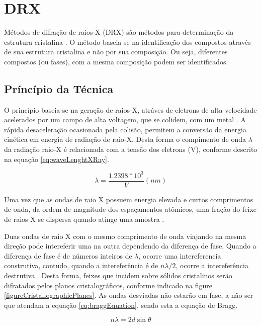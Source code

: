 \section{DRX}
Métodos de difração de raios-X (DRX) são métodos para determinação da
estrutura cristalina \cite{bookMaterialsCharacterizationYang}. O método 
baseia-se na identificação dos compostos através de sua estrutura 
cristalina e não por sua composição. Ou seja, diferentes compostos 
(ou fases), com a mesma composição podem ser identificados.

\subsection{Príncípio da Técnica}
O princípio baseia-se na geração de raios-X, atráves de eletrons de
alta velocidade acelerados por um campo de alta voltagem, que se colidem,
com um metal \cite{bookMaterialsCharacterizationYang}. A rápida desaceleração ocasionada pela colisão, permitem a
conversão da energia cinética em energia de radiação de raio-X. Desta forma
o compimento de onda $\lambda$ da radiação raio-X é relacionada com a tensão
dos eletrons (V), conforme descrito na equação \ref{eq:waveLenghtXRay}.

\begin{equation}\label{eq:waveLenghtXRay}
    \lambda = \frac{1.2398 * 10^{3}}{V} (nm)
\end{equation}

Uma vez que as ondas de raio X possuem energia elevada e curtos
comprimentos de onda, da ordem de magnitude dos espaçamentos atômicos, uma fração do feixe
de raios X se dispersa quando atinge uma amostra \cite{bookMaterialsScienceEngineeringCallister}.

Duas ondas de raio X com o mesmo comprimento de onda viajando na mesma direção
pode intereferir uma na outra dependendo da diferença de fase. Quando a diferença
de fase é de números inteiros de $\lambda$, ocorre uma intereferencia construtiva,
contudo, quando a intereferência é de $n \lambda/2$, ocorre a intereferência destrutiva
\cite{bookMaterialsCharacterizationYang}. Desta forma, feixes que incidem sobre sólidos
cristalinos serão difratados pelos planos cristalográficos, conforme indicado na figure
\ref{figureCristallographicPlanes}. As ondas desviadas não estarão em fase, a não ser que
atendam a equação \ref{eq:braggEquation}, sendo esta a equação de Bragg.

\begin{equation}\label{eq:braggEquation}
    n\lambda = 2d\sin\theta
\end{equation}

